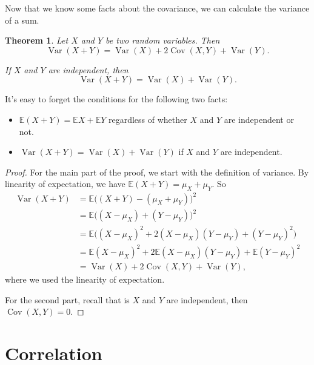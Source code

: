 \documentclass[
  a4paper,
]{book}
\providecommand{\tightlist}{%
  \setlength{\itemsep}{0pt}\setlength{\parskip}{0pt}}
\newtheorem{theorem}{Theorem}[chapter]
\theoremstyle{definition}
\theoremstyle{definition}
\theoremstyle{definition}
\theoremstyle{definition}
\theoremstyle{remark}
\begin{document}
Now that we know some facts about the covariance, we can calculate the variance of a sum.

\begin{theorem}
Let \(X\) and \(Y\) be two random variables. Then
\[ \operatorname{Var}(X + Y) = \operatorname{Var}(X) + 2\operatorname{Cov}(X,Y) + \operatorname{Var}(Y) . \]

If \(X\) and \(Y\) are independent, then
\[ \operatorname{Var}(X + Y) = \operatorname{Var}(X) + \operatorname{Var}(Y) . \]
\end{theorem}

It's easy to forget the conditions for the following two facts:

\begin{itemize}
\tightlist
\item
  \(\mathbb E(X + Y) = \mathbb EX + \mathbb EY\) regardless of whether \(X\) and \(Y\) are independent or not.
\item
  \(\operatorname{Var}(X+Y) = \operatorname{Var}(X) + \operatorname{Var}(Y)\) if \(X\) and \(Y\) are independent.
\end{itemize}

\begin{proof}
For the main part of the proof, we start with the definition of variance. By linearity of expectation, we have \(\mathbb E(X + Y) = \mu_X + \mu_Y\). So
\begin{align*}
\operatorname{Var}(X + Y) &= \mathbb E\big((X + Y) - (\mu_X + \mu_Y)\big)^2 \\
  &= \mathbb E \big((X - \mu_X) + (Y - \mu_Y) \big)^2 \\
  &= \mathbb E \big( (X - \mu_X)^2 + 2(X - \mu_X)(Y - \mu_Y) + (Y - \mu_Y)^2\big) \\
  &= \mathbb E(X - \mu_X)^2 + 2 \mathbb E(X - \mu_X)(Y - \mu_Y) + \mathbb E (Y - \mu_Y)^2 \\
  &= \operatorname{Var}(X) + 2\operatorname{Cov}(X,Y) + \operatorname{Var}(Y) ,
\end{align*}
where we used the linearity of expectation.

For the second part, recall that is \(X\) and \(Y\) are independent, then \(\operatorname{Cov}(X,Y) = 0\).
\end{proof}

\hypertarget{correlation}{%
\section{Correlation}\label{correlation}}
\end{document}
